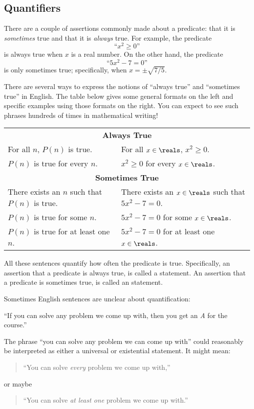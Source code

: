 \subsection{Quantifiers}

There are a couple of assertions commonly made about a predicate: that it
is \emph{sometimes} true and that it is \emph{always} true.  For
example, the predicate
%
\[
\text{``$x^2 \geq 0$''}
\]
%
is always true when $x$ is a real number.  On the other hand, the
predicate
%
\[
\text{``$5x^2 - 7 = 0$''}
\]
%
is only sometimes true; specifically, when $x = \pm \sqrt{7/5}$.

There are several ways to express the notions of ``always true'' and
``sometimes true'' in English.  The table below gives some general
formats on the left and specific examples using those formats on the
right.  You can expect to see such phrases hundreds of times in
mathematical writing!
%
\begin{center}
\begin{tabular}{ll}
\multicolumn{2}{c}{\textbf{Always True}} \\[1ex]
For all $n$, $P(n)$ is true. & For all $x \in \reals$, $x^2 \geq 0$. \\
$P(n)$ is true for every $n$. & $x^2 \geq 0$ for every $x \in \reals$. \\[2ex]
\multicolumn{2}{c}{\textbf{Sometimes True}} \\[1ex]
There exists an $n$ such that $P(n)$ is true. & There exists an $x \in \reals$ such that $5x^2 - 7 = 0$.\\
$P(n)$ is true for some $n$. & $5x^2 - 7 = 0$ for some $x \in \reals$.\\
$P(n)$ is true for at least one $n$. & $5x^2-7=0$ for at least one $x \in \reals$.
\end{tabular}
\end{center}

All these sentences quantify how often the predicate is true.
Specifically, an assertion that a predicate is always true, is called
a  statement.  An assertion that a
predicate is sometimes true, is called an  statement.

Sometimes English sentences are unclear about quantification:
%
\begin{center}
  ``If you can solve any problem we come up with, then you get an \emph{A}
  for the course.''
\end{center}
%
The phrase ``you can solve any problem we can come up with'' could
reasonably be interpreted as either a universal or existential
statement.  It might mean:
%
\begin{quote}
``You can solve \emph{every} problem we come up with,''
\end{quote}
or maybe
\begin{quote}
``You can solve \emph{at least one} problem we come up with.''
\end{quote}

